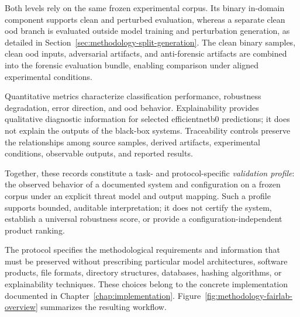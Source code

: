 Both levels rely on the same frozen experimental corpus. Its binary in-domain
component supports clean and perturbed evaluation, whereas a separate clean
\gls{ood} branch is evaluated outside model training and perturbation
generation, as detailed in
Section~\ref{sec:methodology-split-generation}. The clean binary samples,
clean \gls{ood} inputs, adversarial artifacts, and anti-forensic artifacts are
combined into the forensic evaluation bundle, enabling comparison under aligned
experimental conditions.

Quantitative metrics characterize classification performance, robustness
degradation, error direction, and \gls{ood} behavior. Explainability provides
qualitative diagnostic information for selected \gls{efficientnetb0} predictions;
it does not explain the outputs of the black-box systems.
Traceability controls preserve the relationships among source samples, derived
artifacts, experimental conditions, observable outputs, and reported results.

Together, these records constitute a task- and protocol-specific
\textit{validation profile}: the observed behavior of a documented system and
configuration on a frozen corpus under an explicit threat model and output
mapping. Such a profile supports bounded, auditable interpretation; it does
not certify the system, establish a universal robustness score, or provide a
configuration-independent product ranking.

The protocol specifies the methodological requirements and information that
must be preserved without prescribing particular model architectures, software
products, file formats, directory structures, databases, hashing algorithms,
or explainability techniques. These choices belong to the concrete
implementation documented in Chapter~\ref{chap:implementation}.
Figure~\ref{fig:methodology-fairlab-overview} summarizes the resulting
workflow.




